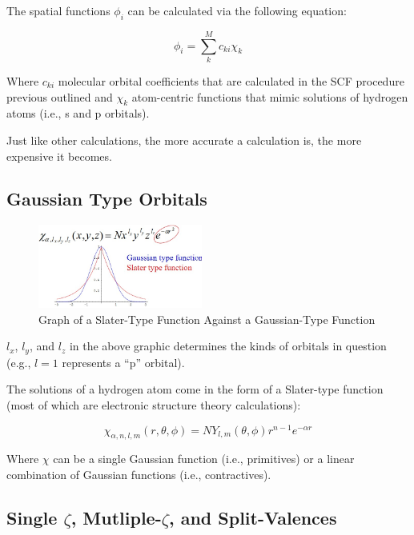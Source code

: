 \documentclass[
  letterpaper,
  DIV=11,
  numbers=noendperiod]{scrreprt}
\begin{document}
The spatial functions \(\phi_i\) can be calculated via the following
equation:

\begin{equation}
  \phi_i = \sum_k^Mc_{ki}\chi_k
\end{equation}

Where \(c_{ki}\) molecular orbital coefficients that are calculated in
the SCF procedure previous outlined and \(\chi_k\) atom-centric
functions that mimic solutions of hydrogen atoms (i.e., s and p
orbitals).

Just like other calculations, the more accurate a calculation is, the
more expensive it becomes.

\hypertarget{gaussian-type-orbitals}{%
\subsection{Gaussian Type Orbitals}\label{gaussian-type-orbitals}}

\begin{figure}

{\centering \includegraphics[width=2.13in,height=\textheight]{./images/wk2a/gaussian.jpg}

}

\caption{Graph of a Slater-Type Function Against a Gaussian-Type
Function}

\end{figure}

\(l_x\), \(l_y\), and \(l_z\) in the above graphic determines the kinds
of orbitals in question (e.g., \(l = 1\) represents a ``p'' orbital).

The solutions of a hydrogen atom come in the form of a Slater-type
function (most of which are electronic structure theory calculations):

\begin{equation}
  \chi_{\alpha, n, l, m}(r, \theta, \phi) = NY_{l, m}(\theta, \phi)r^{n - 1}e^{-\alpha r}
\end{equation}

Where \(\chi\) can be a single Gaussian function (i.e., primitives) or a
linear combination of Gaussian functions (i.e., contractives).

\hypertarget{single-zeta-mutliple-zeta-and-split-valences}{%
\subsection{\texorpdfstring{Single \(\zeta\), Mutliple-\(\zeta\), and
Split-Valences}{Single \textbackslash zeta, Mutliple-\textbackslash zeta, and Split-Valences}}\label{single-zeta-mutliple-zeta-and-split-valences}}
\end{document}
